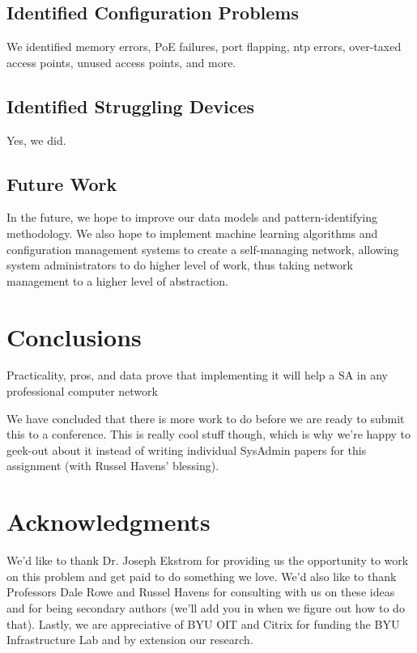 \documentclass{acm_proc_article-sp}
\begin{document}
\subsection{Identified Configuration Problems}
We identified memory errors, PoE failures, port flapping, ntp errors, over-taxed access points, unused access points, and more.
\subsection{Identified Struggling Devices}
Yes, we did.

\subsection{Future Work}
In the future, we hope to improve our data models and pattern-identifying methodology.  We also hope to implement machine learning algorithms and configuration management systems to create a self-managing network, allowing system administrators to do higher level of work, thus taking network management to a higher level of abstraction.

\section{Conclusions}
Practicality, pros, and data prove that implementing it will help a SA in any professional computer network

We have concluded that there is more work to do before we are ready to submit this to a conference.  This is really cool stuff though, which is why we're happy to geek-out about it instead of writing individual SysAdmin papers for this assignment (with Russel Havens' blessing).

\section{Acknowledgments}
We'd like to thank Dr. Joseph Ekstrom for providing us the opportunity to work on this problem and get paid to do something we love.  We'd also like to thank Professors Dale Rowe and Russel Havens for consulting with us on these ideas and for being secondary authors (we'll add you in when we figure out how to do that).  Lastly, we are appreciative of BYU OIT and Citrix for funding the BYU Infrastructure Lab and by extension our research.
\end{document}
